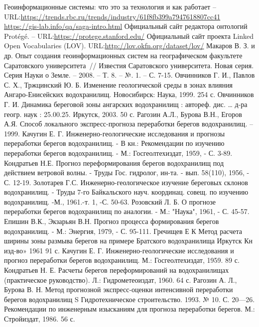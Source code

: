 \documentclass[732,fontsize=14pt,final]{studrep}
\begin{document}
\begin{thebibliography}{99}
 Геоинформационные системы: что это за технология и как работает -- URL:\url{https://trends.rbc.ru/trends/industry/61f8fb399a7947618807cc41}
\url{https://gis-lab.info/qa/saga-intro.html}
 Официальный сайт редактора онтологий Protégé. -- URL:\url{https://protege.stanford.edu/}
 Официальный сайт проекта Linked Open Vocabularies (LOV). URL:\url{http://lov.okfn.org/dataset/lov/}
 Макаров В. З. и др. Опыт создания геоинформационных систем на географическом факультете Саратовского университета~// Известия Саратовского университета. Новая серия. Серия Науки о Земле. – 2008. – Т. 8. – №. 1. – С. 7-15.
Овчинников Г. И., Павлов С. Х., Тржцинский Ю. Б. Изменение геологической среды в зонах влияния Ангаро-Енисейских водохранилищ. Новосибирск: Наука, 1999. 254 с.
Овчинников Г. И. Динамика береговой зоны ангарских водохранилищ : автореф. дис. … д-ра геогр. наук : 25.00.25. Иркутск, 2003. 50 с.
Рагозин А.Л., Бурова В.Н., Егоров А.Я. Способ локального экспресс-прогноза переработки берегов водохранилищ. – 1999.
Качугин Е. Г. Инженерно-геологические исследования и прогнозы переработки берегов водохранилищ. - В кн.: Рекомендации по изучению переработки берегов водохранилищ. - М.: Госгеолтехиздат, 1959, - С. 3-89.
Кондратьев Н.Е. Прогноз переформирования берегов водохранилищ под действием ветровой волны. - Труды Гос. гидролог, ин-та. - вып. 58(110), 1956, - С. 12-19.
Золотарев Г.С. Инженерно-геологическое изучение береговых склонов водохранилищ. - Труды 7-го Байкальского науч. координац. совещ. по изучению водохранилищ. -М., 1961.-т. 1, -С. 50-63.
Розовский Л. Б. О прогнозе переработки берегов водохранилищ по аналогии. - М.: "Наука", 1961, - С. 45-57.
Епишин В.К., Экзарьян В.Н. Прогноз процесса формирования берегов водохранилищ. - М.: Энергия, 1979, - С. 95-111.
Гречищев Е К Метод расчета ширины зоны размыва берегов на примере Братского водохранилища Иркутск Кн изд-во» 1961 91 с.
Качугин Е. Г. Инженерно-геологические исследования и прогноз переработки берегов водохранилищ. М.: Госгеолтехиздат, 1959. 89 с.
Кондратьев Н. Е. Расчеты берегов переформирований на водохранилищах (практическое руководство). Л.: Гидрометеоиздат, 1960. 64 с.
Рагозин А. Л., Бурова В. Н. Метод прогнозной экспресс-оценки интенсивной переработки берегов водохранилищ S Гидротехническое строительство. 1993. № 10. С. 20—26.
Рекомендации по инженерным изысканиям для прогноза переработки берегов. М.: Стройиздат, 1986. 56 с.

\end{thebibliography}
\end{document}
